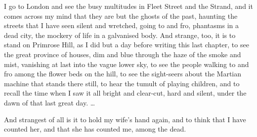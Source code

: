 I go to London and see the busy multitudes in Fleet Street and the
Strand, and it comes across my mind that they are but the ghosts of
the past, haunting the streets that I have seen silent and
wretched, going to and fro, phantasms in a dead city, the mockery
of life in a galvanised body. And strange, too, it is to stand on
Primrose Hill, as I did but a day before writing this last chapter,
to see the great province of houses, dim and blue through the haze
of the smoke and mist, vanishing at last into the vague lower sky,
to see the people walking to and fro among the flower beds on the
hill, to see the sight-seers about the Martian machine that stands
there still, to hear the tumult of playing children, and to recall
the time when I saw it all bright and clear-cut, hard and silent,
under the dawn of that last great day. \ldots{}

And strangest of all is it to hold my wife's hand again, and to
think that I have counted her, and that she has counted me, among
the dead.

